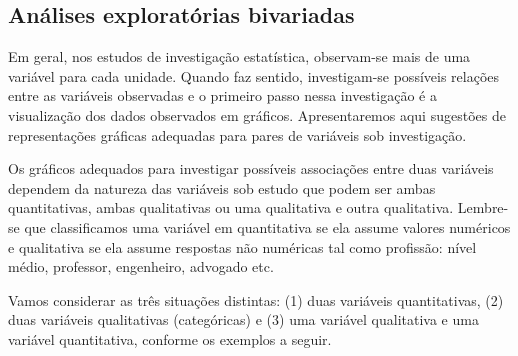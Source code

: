 \subsection{Análises exploratórias bivariadas}

Em geral, nos estudos de investigação estatística, observam-se mais de uma variável para cada unidade. Quando faz sentido, investigam-se possíveis relações entre as variáveis observadas e o primeiro passo nessa investigação é a visualização dos dados observados em gráficos. Apresentaremos aqui sugestões de representações gráficas adequadas para pares de variáveis sob investigação.

Os gráficos adequados para investigar possíveis associações entre duas variáveis dependem da natureza das variáveis sob estudo que podem ser ambas quantitativas, ambas qualitativas ou uma qualitativa e outra qualitativa. Lembre-se que classificamos uma variável em quantitativa se ela assume valores numéricos e qualitativa se ela assume respostas não numéricas tal como profissão: nível médio, professor, engenheiro, advogado etc.

Vamos considerar as três situações distintas: (1) duas variáveis quantitativas, (2) duas variáveis qualitativas (categóricas) e (3) uma variável qualitativa e uma variável quantitativa, conforme os exemplos a seguir.

